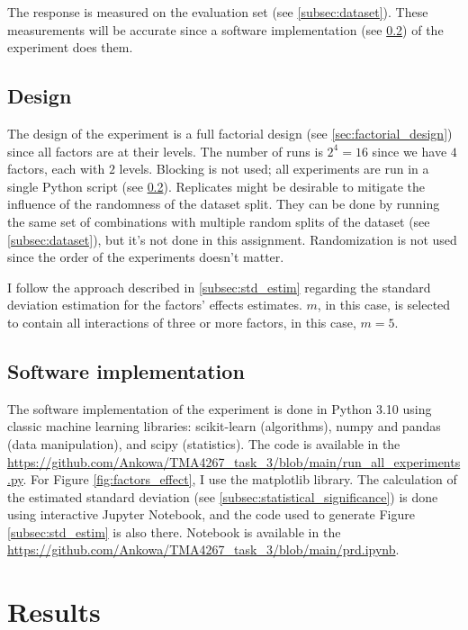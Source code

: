 \documentclass{article}
\begin{document}
The response is measured on the evaluation set (see \ref{subsec:dataset}). These measurements will be accurate since a software implementation (see \ref{subsec:software_implementation}) of the experiment does them.

\subsection{Design}
The design of the experiment is a full factorial design (see \ref{sec:factorial_design}) since all factors are at their levels. The number of runs is $2^4=16$ since we have $4$ factors, each with $2$ levels. Blocking is not used; all experiments are run in a single Python script (see \ref{subsec:software_implementation}). Replicates might be desirable to mitigate the influence of the randomness of the dataset split. They can be done by running the same set of combinations with multiple random splits of the dataset (see \ref{subsec:dataset}), but it's not done in this assignment. Randomization is not used since the order of the experiments doesn't matter.

I follow the approach described in \ref{subsec:std_estim} regarding the standard deviation estimation for the factors' effects estimates. $m$, in this case, is selected to contain all interactions of three or more factors, in this case, $m=5$.

\subsection{Software implementation}
\label{subsec:software_implementation}

The software implementation of the experiment is done in Python 3.10 using classic machine learning libraries: scikit-learn (algorithms), numpy and pandas (data manipulation), and scipy (statistics). The code is available in the \url{https://github.com/Ankowa/TMA4267_task_3/blob/main/run_all_experiments.py}. For Figure \ref{fig:factors_effect}, I use the matplotlib library. The calculation of the estimated standard deviation (see \ref{subsec:statistical_significance}) is done using interactive Jupyter Notebook, and the code used to generate Figure \ref{subsec:std_estim} is also there. Notebook is available in the \url{https://github.com/Ankowa/TMA4267_task_3/blob/main/prd.ipynb}.

\section{Results}
\end{document}
